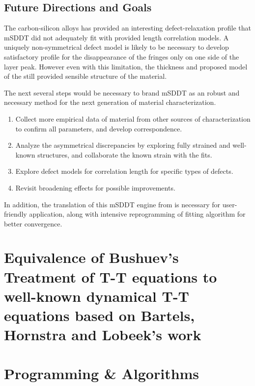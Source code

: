 \section{Future Directions and Goals}

The carbon-silicon alloys has provided an interesting defect-relaxation profile that mSDDT did not adequately fit with provided length correlation models. A uniquely non-symmetrical defect model is likely to be necessary to develop satisfactory profile for the disappearance of the fringes only on one side of the layer peak.  However even with this limitation, the thickness and proposed model of the  still provided sensible structure of the material.

The next several steps would be necessary to brand mSDDT as an robust and necessary method for the next generation of material characterization.

{\SingleSpacing
\begin{enumerate}
\item Collect more empirical data of material from other sources of characterization to confirm all parameters, and develop correspondence.
\item Analyze the asymmetrical discrepancies by exploring fully strained and well-known structures, and collaborate the known strain with the fits.
\item Explore defect models for correlation length for specific types of defects.
\item Revisit broadening effects for possible improvements.
\end{enumerate}}



In addition, the translation of this mSDDT engine from \MathLogo is necessary for user-friendly application, along with intensive reprogramming of fitting algorithm for better convergence.







\appendix

	\chapter{Equivalence of Bushuev's Treatment of T-T equations to well-known dynamical T-T equations based on Bartels, Hornstra and Lobeek's work}\label{Compare2}

\chapter{Programming \& Algorithms}

